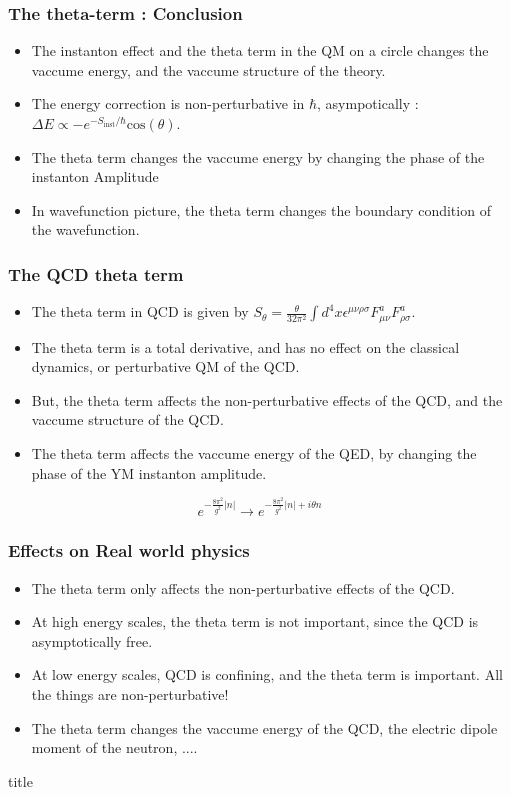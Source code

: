 \documentclass[10pt]{beamer}
\begin{document}
\begin{frame}
    \frametitle{The theta-term : Conclusion}
    \begin{itemize}
    \item The instanton effect and the theta term in the QM on a circle changes the vaccume energy, and the vaccume structure of the theory.
    \item The energy correction is non-perturbative in $\hbar$, asympotically : $\Delta E \propto -e^{-S_{\text{inst}}/\hbar}\text{cos}(\theta)$.
    \item The theta term changes the vaccume energy by changing the phase of the instanton Amplitude
    \item In wavefunction picture, the theta term changes the boundary condition of the wavefunction.
    \end{itemize}
\end{frame}

\begin{frame}
    \frametitle{The QCD theta term}
    \begin{itemize}
    \item The theta term in QCD is given by $S_{\theta} = \frac{\theta}{32\pi^2}\int d^4x \epsilon^{\mu\nu\rho\sigma}F_{\mu\nu}^a F_{\rho\sigma}^a$.
    \item The theta term is a total derivative, and has no effect on the classical dynamics, or perturbative QM of the QCD.
    \item But, the theta term affects the non-perturbative effects of the QCD, and the vaccume structure of the QCD.
    \item The theta term affects the vaccume energy of the QED, by changing the phase of the YM instanton amplitude.
    \end{itemize}
    \begin{equation}
        e^{-\frac{8\pi^2}{g^2}|n|} \rightarrow e^{-\frac{8\pi^2}{g^2}|n| + i\theta n}
    \end{equation}
\end{frame}

\begin{frame}
    \frametitle{Effects on Real world physics}
    \begin{itemize}
    \item The theta term only affects the non-perturbative effects of the QCD.
    \item At high energy scales, the theta term is not important, since the QCD is asymptotically free.
    \item At low energy scales, QCD is confining, and the theta term is important. All the things are non-perturbative!
    \item The theta term changes the vaccume energy of the QCD, the electric dipole moment of the neutron, ....
    \end{itemize}
\end{frame}

\begin{frame}{title}
    
\end{frame}
\end{document}
